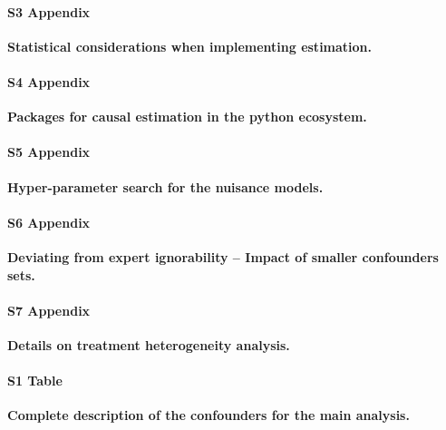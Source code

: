 \documentclass[10pt,letterpaper]{article}
\begin{document}
\paragraph*{S3 Appendix}
\label{apd:statistical_considerations}
{\bf Statistical considerations when implementing
  estimation.}

\paragraph*{S4 Appendix}
\label{apd:packages}
{\bf Packages for causal estimation in the python ecosystem.}

\paragraph*{S5 Appendix}
\label{apd:hyper_parameter_search}
{\bf Hyper-parameter search for the nuisance models.}

\paragraph*{S6 Appendix}
\label{apd:vibration_analysis_for_confounders}
{\bf Deviating from expert ignorability -- Impact of smaller confounders sets.}

\paragraph*{S7 Appendix}
\label{apd:hte}
{\bf Details on treatment heterogeneity analysis.}

\paragraph*{S1 Table}
\label{apd:albumin_for_sepsis:table1_complete}
{\bf Complete description of the confounders for the main analysis.}
\end{document}
